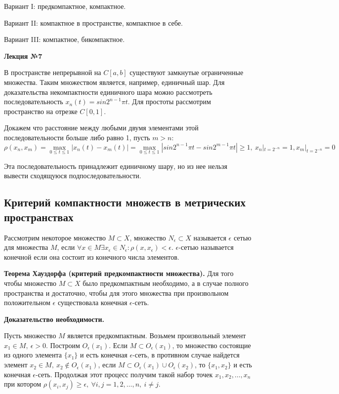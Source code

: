 \documentclass[14pt,a4paper]{extarticle}
\theoremstyle{definition}
\theoremstyle{remark}
\newcommand{\sep}{ , \ \allowbreak }
\renewcommand{\[}{\begin{dmath*}[compact]}
\renewcommand{\]}{\end{dmath*}}
\newcommand{\tth}[1][]{\textbf{Теорема#1.}}
\newcommand{\btev}[1][]{\textbf{Доказательство#1.}
}
\begin{document}
Вариант I: предкомпактное, компактное.

Вариант II: компактное в пространстве, компактное в себе.

Вариант III: компактное, бикомпактное.

\textbf{Лекция №7}

В пространстве непрерывной на $C[a,b]$ существуют замкнутые ограниченные множества. Таким множеством является, например, единичный шар. Для доказательства некомпактности единичного шара можно рассмотреть последовательность $x_n(t)=sin2^{n-1}\pi t$. Для простоты рассмотрим пространство на отрезке $C[0,1]$.

Докажем что расстояние между любыми двумя элементами этой последовательности больше либо равно 1, пусть $m>n$:
\[ {\rho(x_n,x_m)} = {\max_{0\leq t \leq 1} |x_n(t)-x_m(t)|} = \max_{0\leq t \leq 1} |sin 2^{n-1}\pi t-\allowbreak sin 2^{m-1}\pi t|\geq 1 \sep x_n|_{t=2^{-n}}=1, x_m|_{t=2^{-n}}=0 \]

Эта последовательность принадлежит единичному шару, но из нее нельзя вывести сходящуюся подпоследовательности.

\subsection{Критерий компактности множеств в метрических пространствах}

Рассмотрим некоторое множество $M\subset X$, множество $N_{\epsilon} \subset X$ называется $\epsilon$ сетью для множества $M$, если $\forall x \in M \exists x_{\epsilon} \in N_{\epsilon}: \rho(x,x_{\epsilon})<\epsilon$. $\epsilon$-сетью называется конечной если она состоит из конечного числа элементов.

\tth[ Хауздорфа (критерий предкомпактности множества)] Для того чтобы множество $M\subset X$ было предкомпактным необходимо, а в случае полного пространства и достаточно, чтобы для этого множества при произвольном положительном $\epsilon$ существовала конечная $\epsilon$-сеть.

\btev[ необходимости]
  Пусть множество $M$ является предкомпактным. Возьмем произвольный элемент $x_1 \in M\sep \epsilon > 0$.
  Построим $O_{\epsilon}(x_1)$. Если $M \subset O_{\epsilon}(x_1)$, то множество состоящие из одного элемента $\{x_1\}$ и есть конечная $\epsilon$-сеть, в противном случае найдется элемент $x_2 \in M\sep x_2 \not\in O_\epsilon(x_1)$, если $M\subset O_\epsilon(x_1)\cup O_\epsilon(x_2)$, то $\{x_1,x_2\}$ и есть конечная $\epsilon$-сеть. Продолжая этот процесс получим такой набор точек $x_1, x_2,\dots,x_n$ при котором $\rho(x_i,x_j)\geq \epsilon\sep \forall i,j=1,2,\dots,n\sep i\neq j$.
\end{document}
